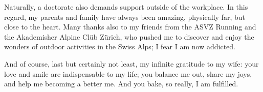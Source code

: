 {Naturally, a doctorate also demands support outside of the workplace. In this regard, my parents and family have always been amazing, physically far, but close to the heart. Many thanks also to my friends from the ASVZ Running and the Akademisher Alpine Clüb Zürich, who pushed me to discover and enjoy the wonders of outdoor activities in the Swiss Alps; I fear I am now addicted.

And of course, last but certainly not least, my infinite gratitude to my wife: your love and smile are indispensable to my life; you balance me out, share my joys, and help me becoming a better me. And you bake, so really, I am fulfilled.

}
